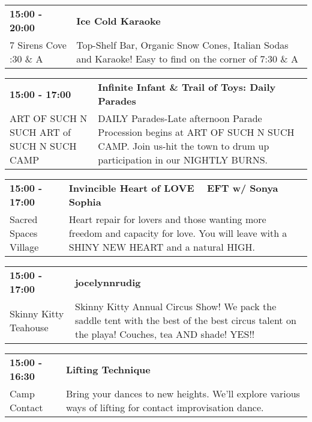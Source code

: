 \begin{tabular}{ p{1in} p{2.2in} }
    \textbf{15:00 - 20:00} & \textbf{Ice Cold Karaoke} \\
    7 Sirens Cove \newline 7:30 \& A & Top-Shelf Bar, Organic Snow Cones, Italian Sodas and Karaoke! Easy to find on the corner of 7:30 \& A \\
    \hline 
\end{tabular}
    
\begin{tabular}{ p{1in} p{2.2in} }
    \textbf{15:00 - 17:00} & \textbf{Infinite Infant \& Trail of Toys: Daily Parades} \\
    ART OF SUCH N SUCH \newline ART of SUCH N SUCH CAMP & DAILY Parades-Late afternoon
Parade Procession begins at ART OF SUCH N SUCH CAMP. Join us-hit the town to drum up participation in our NIGHTLY BURNS. \\
    \hline 
\end{tabular}
    
\begin{tabular}{ p{1in} p{2.2in} }
    \textbf{15:00 - 17:00} & \textbf{Invincible Heart of LOVE ~ EFT w/ Sonya Sophia} \\
    Sacred Spaces Village \newline  & Heart repair for lovers and those wanting more freedom and capacity for love. You will leave with a SHINY NEW HEART and a natural HIGH. \\
    \hline 
\end{tabular}
    
\begin{tabular}{ p{1in} p{2.2in} }
    \textbf{15:00 - 17:00} & \textbf{jocelynnrudig} \\
    Skinny Kitty Teahouse \newline  & Skinny Kitty Annual Circus Show! 
We pack the saddle tent with the best of the best circus talent on the playa! Couches, tea AND shade! YES!! \\
    \hline 
\end{tabular}
    
\begin{tabular}{ p{1in} p{2.2in} }
    \textbf{15:00 - 16:30} & \textbf{Lifting Technique} \\
    Camp Contact \newline  & Bring your dances to new heights. We'll explore various ways of lifting for contact improvisation dance. \\
    \hline 
\end{tabular}
    

